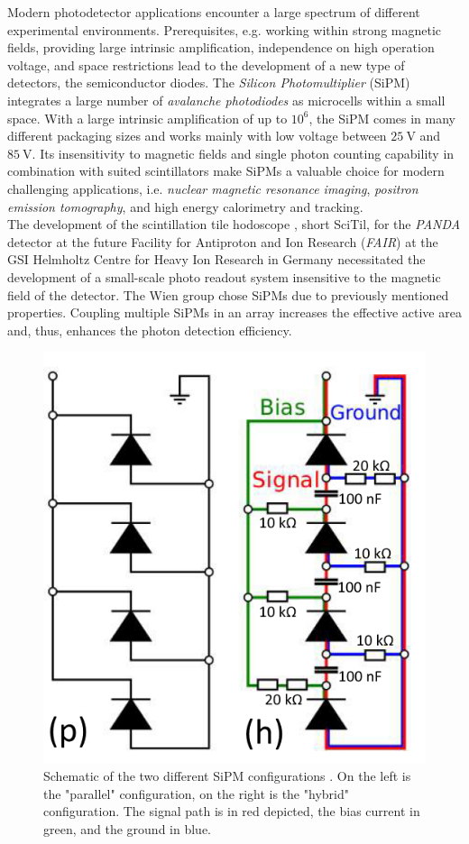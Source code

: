 \documentclass[%
 reprint,
 amsmath,amssymb,
 aps,
]{revtex4-1}
\newcommand{\tit}[1]{\textit{#1}}
\begin{document}
Modern photodetector applications encounter a large spectrum of different experimental environments. Prerequisites, e.g. working within strong magnetic fields, providing large intrinsic amplification, independence on high operation voltage, and space restrictions lead to the development of a new type of detectors, the semiconductor diodes. The \tit{Silicon Photomultiplier} (SiPM) integrates a large number of \tit{avalanche photodiodes} as microcells within a small space. With a large intrinsic amplification of up to $10^6$, the SiPM comes in many different packaging sizes and works mainly with low voltage between $\SI{25}{\volt}$ and $\SI{85}{\volt}$. Its insensitivity to magnetic fields and single photon counting capability in combination with suited scintillators make SiPMs a valuable choice for modern challenging applications, i.e. \tit{nuclear magnetic resonance imaging}, \tit{positron emission tomography}, and high energy calorimetry and tracking. \\ \indent
The development of the scintillation tile hodoscope \cite{SciTil}, short SciTil, for the \tit{PANDA} detector at the future Facility for Antiproton and Ion Research (\tit{FAIR}) at the GSI Helmholtz Centre for Heavy Ion Research in Germany \cite{FAIR} necessitated the development of a small-scale photo readout system insensitive to the magnetic field of the detector. The Wien group chose SiPMs due to previously mentioned properties. Coupling multiple SiPMs in an array increases the effective active area and, thus, enhances the photon detection efficiency. \\ \indent
\begin{figure}[b!]
	\centering
	\includegraphics[width=0.5\linewidth]{./graphics/ch4/circuits.PNG}
	\caption{Schematic of the two different SiPM configurations \cite{sebastian}. On the left is the "parallel" configuration, on the right is the "hybrid" configuration. The signal path is in red depicted, the bias current in green, and the ground in blue.  }
	\label{fig:PCB}
\end{figure}
\end{document}
